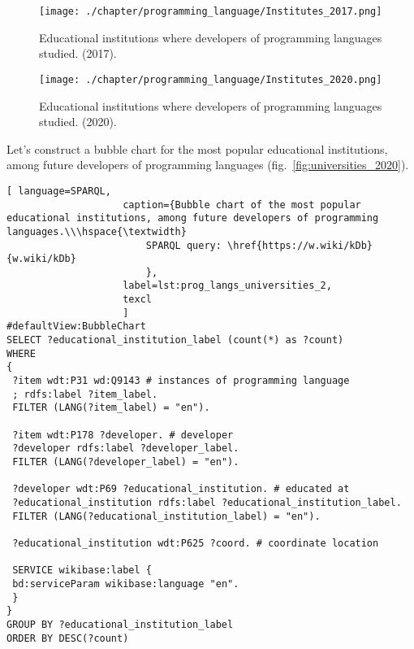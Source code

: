 \begin{figure}[h]
\centering
	\texttt{[image: ./chapter/programming\_language/Institutes\_2017.png]}
	\caption{Educational institutions where developers of programming languages studied. (2017).}
	\label{fig:institutes_2017}
\end{figure}

\begin{figure}[h]
\centering
	\texttt{[image: ./chapter/programming\_language/Institutes\_2020.png]}
	\caption{Educational institutions where developers of programming languages studied. (2020).}
	\label{fig:institutes_2020}
\end{figure}

Let's construct a bubble chart for the most popular educational institutions, among future developers of programming languages (fig.~\ref{fig:universities_2020}). 

\begin{lstlisting}[ language=SPARQL, 
                    caption={Bubble chart of the most popular educational institutions, among future developers of programming languages.\\\hspace{\textwidth}
                        SPARQL query: \href{https://w.wiki/kDb}{w.wiki/kDb}
                        },
                    label=lst:prog_langs_universities_2,
                    texcl 
                    ]
#defaultView:BubbleChart
SELECT ?educational_institution_label (count(*) as ?count)
WHERE
{
 ?item wdt:P31 wd:Q9143 # instances of programming language
 ; rdfs:label ?item_label. 
 FILTER (LANG(?item_label) = "en"). 
 
 ?item wdt:P178 ?developer. # developer
 ?developer rdfs:label ?developer_label. 
 FILTER (LANG(?developer_label) = "en"). 
 	
 ?developer wdt:P69 ?educational_institution. # educated at
 ?educational_institution rdfs:label ?educational_institution_label. 
 FILTER (LANG(?educational_institution_label) = "en").
 
 ?educational_institution wdt:P625 ?coord. # coordinate location
 
 SERVICE wikibase:label {
 bd:serviceParam wikibase:language "en".
 } 	
}
GROUP BY ?educational_institution_label
ORDER BY DESC(?count)
\end{lstlisting}%

